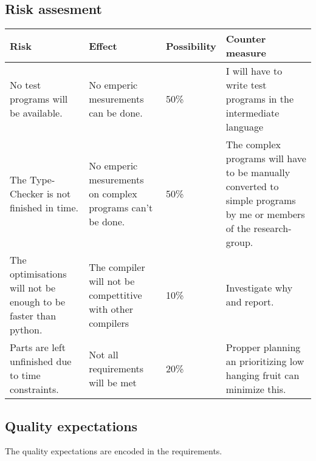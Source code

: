 \subsection{Risk assesment}
\begin{center}
   \begin{tabular}
      {| p{} | p{} | l | p{} |}
      \hline
      \textbf{Risk} & \textbf{Effect} & \textbf{Possibility} & \textbf{Counter measure} \\
      \hline
      No test programs will be available.  & 
	  No emperic mesurements can be done. & 
	  50\% & 
	  I will have to write test programs in the intermediate language \\
	  \hline
      The Type-Checker is not finished in time. &
	  No emperic mesurements on complex programs can't be done. & 
	  50\% & 
	  The complex programs will have to be manually converted to simple programs by me or members of the research-group. \\
      \hline
      The optimisations will not be enough to be faster than python. & 
	  The compiler will not be compettitive with other compilers & 
	  10\% & 
	  Investigate why and report. \\
	  \hline
      Parts are left unfinished due to time constraints. & 
	  Not all requirements will be met & 
	  20\% & 
	  Propper planning an prioritizing low hanging fruit can minimize this. \\
	  \hline
   \end{tabular}
\end{center}

\subsection{Quality expectations}
The quality expectations are encoded in the requirements.

